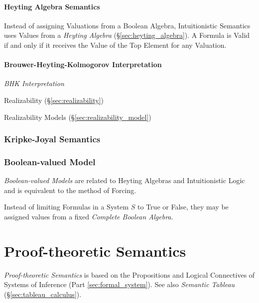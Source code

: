 \paragraph{Heyting Algebra Semantics}\label{sec:heyting_semantics}\hfill

Instead of assigning Valuations from a Boolean Algebra, Intuitionistic
Semantics uses Values from a \emph{Heyting Algebra}
(\S\ref{sec:heyting_algebra}). A Formula is Valid if and only if it
receives the Value of the Top Element for any Valuation.



\paragraph{Brouwer-Heyting-Kolmogorov Interpretation}\hfill
\label{sec:brouwer_heyting_kolmogorov}

\emph{BHK Interpretation}

Realizability (\S\ref{sec:realizability})

Realizability Models (\S\ref{sec:realizability_model})



\subsubsection{Kripke-Joyal Semantics}\label{sec:kripke_joyal}

\subsubsection{Boolean-valued Model}\label{sec:boolean_model}

\emph{Boolean-valued Models} are related to Heyting Algebras and
Intuitionistic Logic and is equivalent to the method of Forcing.

Instead of limiting Formulas in a System $S$ to True or False, they
may be assigned values from a fixed \emph{Complete Boolean Algebra}.



\section{Proof-theoretic Semantics}\label{sec:proof_semantics}

\emph{Proof-theoretic Semantics} is based on the Propositions and
Logical Connectives of Systems of Inference (Part
\ref{sec:formal_system}). See also \emph{Semantic Tableau}
(\S\ref{sec:tableau_calculus}).

